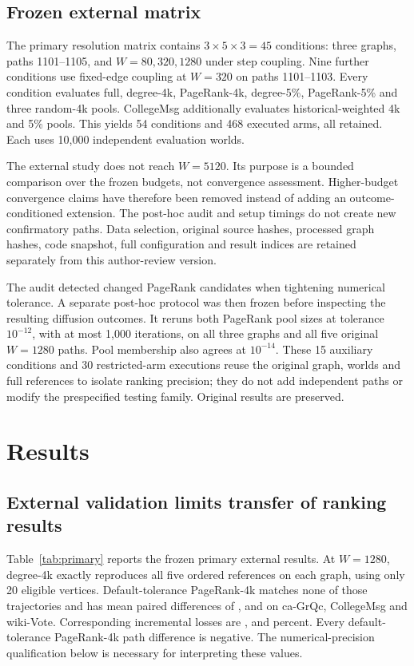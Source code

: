 \documentclass[smallextended]{svjour3}
\begin{document}
\subsection{Frozen external matrix}
The primary resolution matrix contains $3\times5\times3=45$ conditions: three graphs, paths 1101--1105, and $W=80,320,1280$ under step coupling. Nine further conditions use fixed-edge coupling at $W=320$ on paths 1101--1103. Every condition evaluates full, degree-4k, PageRank-4k, degree-5\%, PageRank-5\% and three random-4k pools. CollegeMsg additionally evaluates historical-weighted 4k and 5\% pools. This yields 54 conditions and 468 executed arms, all retained. Each uses 10,000 independent evaluation worlds.

The external study does not reach $W=5120$. Its purpose is a bounded comparison over the frozen budgets, not convergence assessment. Higher-budget convergence claims have therefore been removed instead of adding an outcome-conditioned extension. The post-hoc audit and setup timings do not create new confirmatory paths. Data selection, original source hashes, processed graph hashes, code snapshot, full configuration and result indices are retained separately from this author-review version.

The audit detected changed PageRank candidates when tightening numerical tolerance. A separate post-hoc protocol was then frozen before inspecting the resulting diffusion outcomes. It reruns both PageRank pool sizes at tolerance $10^{-12}$, with at most 1,000 iterations, on all three graphs and all five original $W=1280$ paths. Pool membership also agrees at $10^{-14}$. These 15 auxiliary conditions and 30 restricted-arm executions reuse the original graph, worlds and full references to isolate ranking precision; they do not add independent paths or modify the prespecified testing family. Original results are preserved.

\section{Results}
\subsection{External validation limits transfer of ranking results}
Table~\ref{tab:primary} reports the frozen primary external results. At $W=1280$, degree-4k exactly reproduces all five ordered references on each graph, using only 20 eligible vertices. Default-tolerance PageRank-4k matches none of those trajectories and has mean paired differences of \GrqcPRDelta{}, \CollegePRDelta{} and \WikiPRDelta{} on ca-GrQc, CollegeMsg and wiki-Vote. Corresponding incremental losses are \GrqcPRLoss{}, \CollegePRLoss{} and \WikiPRLoss{} percent. Every default-tolerance PageRank-4k path difference is negative. The numerical-precision qualification below is necessary for interpreting these values.

\end{document}
